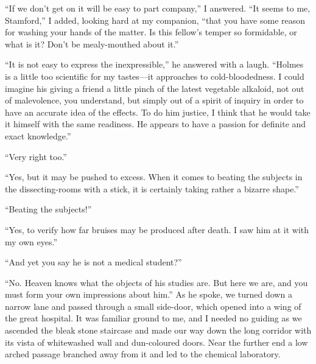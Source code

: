 \documentclass[12pt,english,oneside]{book}
\newcommand{\mdsh}[1]{\mbox{#1}\linebreak[1]}
\begin{document}
{}``If we don't get on it will be easy to part company,'' I answered.
{}``It seems to me, Stamford,'' I added, looking hard at my companion,
{}``that you have some reason for washing your hands of the matter.
Is this fellow's temper so formidable, or what is it? Don't be mealy-mouthed
about it.''

{}``It is not easy to express the inexpressible,'' he answered with
a laugh. {}``Holmes is a little too scientific for my tastes\mdsh{---}it
approaches to cold-bloodedness. I could imagine his giving a friend
a little pinch of the latest vegetable alkaloid, not out of malevolence,
you understand, but simply out of a spirit of inquiry in order to
have an accurate idea of the effects. To do him justice, I think that
he would take it himself with the same readiness. He appears to have
a passion for definite and exact knowledge.''

{}``Very right too.''

{}``Yes, but it may be pushed to excess. When it comes to beating
the subjects in the dissecting-rooms with a stick, it is certainly
taking rather a bizarre shape.''

{}``Beating the subjects!''

{}``Yes, to verify how far bruises may be produced after death. I
saw him at it with my own eyes.''

{}``And yet you say he is not a medical student?''

{}``No. Heaven knows what the objects of his studies are. But here
we are, and you must form your own impressions about him.'' As he
spoke, we turned down a narrow lane and passed through a small side-door,
which opened into a wing of the great hospital. It was familiar ground
to me, and I needed no guiding as we ascended the bleak stone staircase
and made our way down the long corridor with its vista of whitewashed
wall and dun-coloured doors. Near the further end a low arched passage
branched away from it and led to the chemical laboratory.
\end{document}
